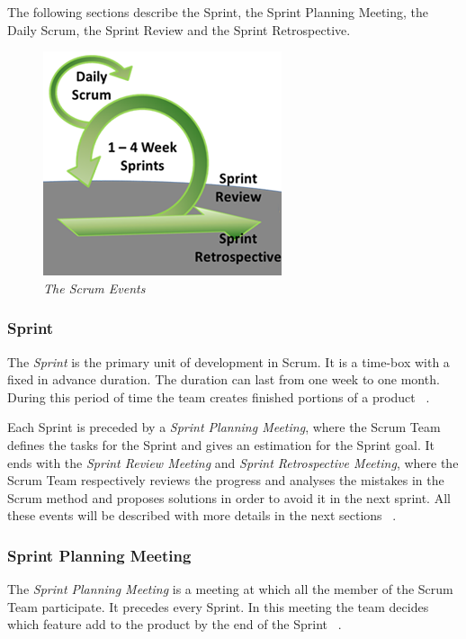 			The following sections describe the Sprint, the Sprint Planning Meeting, the Daily Scrum, the Sprint Review and the Sprint Retrospective.

			\begin{figure}[h]
			  \begin{center} 
			    \includegraphics[scale=0.8]{images/ch_04/scrum_events.png}
			  \end{center} 
			  \caption{\textit{The Scrum Events}}  
			  \label{fig:ScrumEvents}
		  	\end{figure}
			


			
			\subsubsection{Sprint}\label{ref_scrum_sprint}
			The \emph{Sprint} is the primary unit of development in Scrum. It is a time-box with a fixed in advance duration. The duration can last from one week to one month. During this period of time the team creates finished portions of a product ~\cite{scrumEnglishGuide}. 
	
			Each Sprint is preceded by a \emph{Sprint Planning Meeting}, where the Scrum Team defines the tasks for the Sprint and gives an estimation for the Sprint goal. It ends with the \emph{Sprint Review Meeting} and \emph{Sprint Retrospective Meeting}, where the Scrum Team respectively reviews the progress and analyses the mistakes in the Scrum method and proposes solutions in order to avoid it in the next sprint. All these events will be described with more details in the next sections ~\cite{scrumEnglishGuide}.  


			\subsubsection{Sprint Planning Meeting}\label{ref_scrum_sprint_plan}
			The \emph{Sprint Planning Meeting} is a meeting at which all the member of the Scrum Team participate. It precedes every Sprint. In this meeting the team decides which feature add to the product by the end of the Sprint ~\cite{scrumEnglishGuide}.

